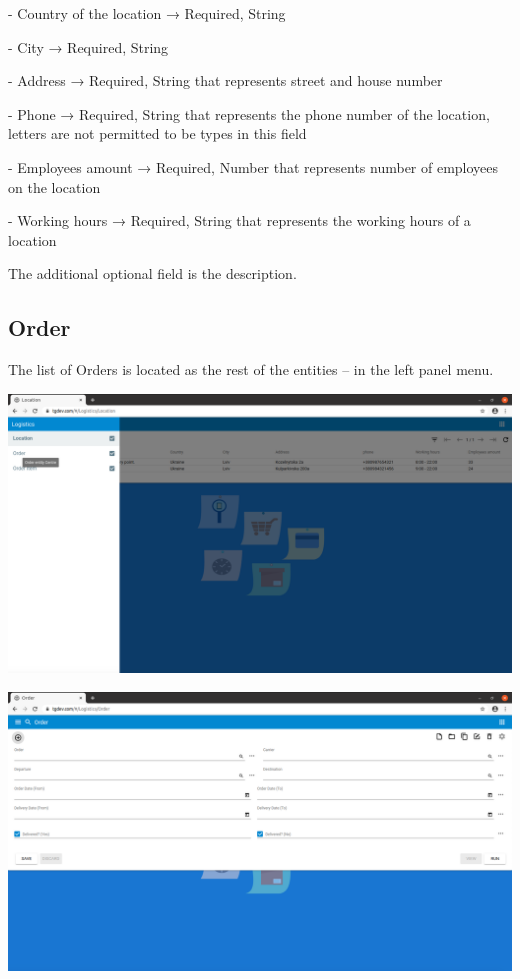 - Country of the location → Required, String

- City → Required, String

- Address → Required, String that represents street and house number

- Phone → Required, String that represents the phone number of the location, letters are not permitted to be types in this field

- Employees amount → Required, Number that represents number of employees on the location

- Working hours → Required, String that represents the working hours of a location

The additional optional field is the description.


\subsection{Order}

The list of Orders is located as the rest of the entities -- in the left panel menu. 

\includegraphics[width=\textwidth]{sections/01-chapter/images/order11.png}


\includegraphics[width=\textwidth]{sections/01-chapter/images/order12.png}

